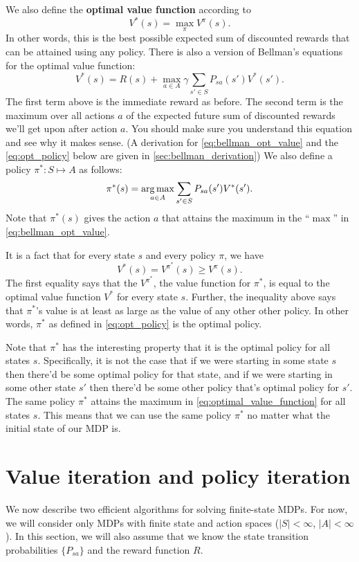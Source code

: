 We also define the \textbf{optimal value function} according to
\begin{equation}\label{eq:optimal_value_function}
V^*(s) = \max_\pi V^\pi(s).
\end{equation}
In other words, this is the best possible expected sum of discounted rewards
that can be attained using any policy. There is also a version of Bellman's
equations for the optimal value function:
\begin{equation}\label{eq:bellman_opt_value}
    V^*(s) = R(s) + \max_{a\in A} \gamma \sum_{s'\in S} P_{sa}(s')V^*(s').    
\end{equation}
The first term above is the immediate reward as before. The second term
is the maximum over all actions $a$ of the expected future sum of discounted
rewards we'll get upon after action $a$. You should make sure you understand
this equation and see why it makes sense. (A derivation for \cref{eq:bellman_opt_value} and
the \cref{eq:opt_policy} below are given in \cref{sec:bellman_derivation})
We also define a policy $\pi^* : S \mapsto A$ as follows:
\begin{equation}\label{eq:opt_policy}
    \pi^*(s) = \argmax_{a\in A} \sum_{s'\in S} P_{sa}(s')V^*(s').
\end{equation}
Note that $\pi^*(s)$ gives the action $a$ that attains the maximum in the ``$\max$''
in \cref{eq:bellman_opt_value}.

It is a fact that for every state $s$ and every policy $\pi$, we have
\[
    V^*(s) = V^{\pi^*}(s) \ge V^\pi(s).
\]
The first equality says that the $V^{\pi^*}$, the value function for $\pi^*$, is equal to the
optimal value function $V^*$ for every state $s$. Further, the inequality above
says that $\pi^*$'s value is at least as large as the value of any other other policy. %
In other words, $\pi^*$ as defined in \cref{eq:opt_policy} is the optimal policy.

Note that $\pi^*$ has the interesting property that it is the optimal policy for
all states $s$. Specifically, it is not the case that if we were starting in some
state $s$ then there'd be some optimal policy for that state, and if we were
starting in some other state $s'$ then there'd be some other policy that's
optimal policy for $s'$. The same policy $\pi^*$ attains the maximum in \cref{eq:optimal_value_function}
for all states $s$. This means that we can use the same policy $\pi^*$ no matter
what the initial state of our MDP is.

\chapter{Value iteration and policy iteration}\label{sec:vi_pi}
We now describe two efficient algorithms for solving finite-state MDPs. For
now, we will consider only MDPs with finite state and action spaces ($|S| < \infty$, $|A| < \infty$). In this section, we will also assume that we know the state
transition probabilities $\{P_{sa}\}$ and the reward function $R$.

